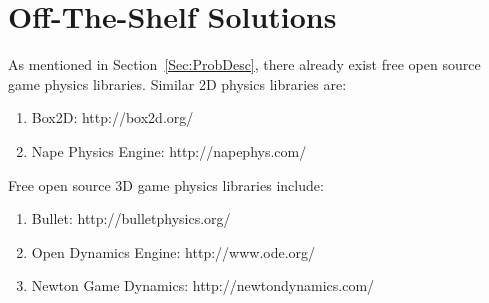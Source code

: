 \documentclass[12pt]{article}
\begin{document}
\section{Off-The-Shelf Solutions}
\label{Sec:Off-Solu}
As mentioned in Section~\ref{Sec:ProbDesc}, there already exist free open source game physics libraries. Similar 2D physics libraries are:
\begin{enumerate}
\item{Box2D: http://box2d.org/}
\item{Nape Physics Engine: http://napephys.com/}
\end{enumerate}
Free open source 3D game physics libraries include:
\begin{enumerate}
\item{Bullet: http://bulletphysics.org/}
\item{Open Dynamics Engine: http://www.ode.org/}
\item{Newton Game Dynamics: http://newtondynamics.com/}
\end{enumerate}
\end{document}
